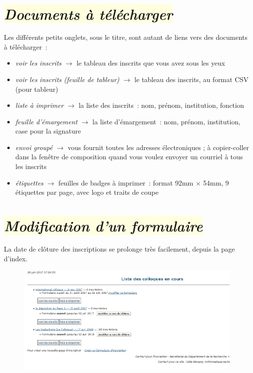 \documentclass[10pt,a4paper]{article}
\newcommand{\jaunepale}[1]{\colorbox{LightYellow}{#1}}
\begin{document}
\section*{\jaunepale{\emph{Documents à télécharger}}}

Les différents petits onglets, sous le titre, sont autant de liens vers des documents à télécharger :

\begin{itemize}
  \item \emph{voir les inscrits} $\longrightarrow$ le tableau des inscrits que vous avez sous les yeux
  \item \emph{voir les inscrits (feuille de tableur)} $\longrightarrow$ le tableau des inscrits, au format CSV (pour tableur)
  \item \emph{liste à imprimer} $\longrightarrow$ la liste des inscrits : nom, prénom, institution, fonction
  \item \emph{feuille d'émargement} $\longrightarrow$ la liste d'émargement : nom, prénom, institution, case pour la signature
  \item \emph{envoi groupé} $\longrightarrow$ vous fournit toutes les adresses électroniques ; à copier-coller dans la fenêtre de composition quand vous voulez envoyer un courriel à tous les inscrits
  \item \emph{étiquettes} $\longrightarrow$ feuilles de badges à imprimer : format 92mm $\times$ 54mm, 9 étiquettes par page, avec logo et traits de coupe
\end{itemize}

\newpage

\section*{\jaunepale{\emph{Modification d'un formulaire}}}

La date de clôture des inscriptions se prolonge très facilement, depuis la page d'index.

\begin{figure}[h]
  \includegraphics[width=500px]{images/suivi-index-2}
 \end{figure}
\end{document}
